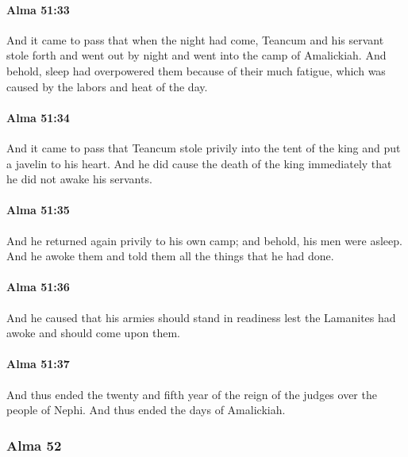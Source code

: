 		\paragraph{Alma 51:33} %
			\label{ALMA-51-33}

			And it came to pass that when the night had come,
			Teancum and his servant stole forth and went out by night
			and went into the camp of Amalickiah.
			And behold, sleep had overpowered them
			because of their much fatigue,
			which was caused by the labors and heat of the day.

		\paragraph{Alma 51:34} %
			\label{ALMA-51-34}

			And it came to pass that Teancum stole privily into the tent of the king
			and put a javelin to his heart.
			And he did cause the death of the king immediately
			that he did not awake his servants.

		\paragraph{Alma 51:35} %
			\label{ALMA-51-35}

			And he returned again privily to his own camp;
			and behold, his men were asleep.
			And he awoke them and told them all the things that he had done.

		\paragraph{Alma 51:36} %
			\label{ALMA-51-36}

			And he caused that his armies should stand in readiness
			lest the Lamanites had awoke and should come upon them.

		\paragraph{Alma 51:37} %
			\label{ALMA-51-37}

			And thus ended the twenty and fifth year
			of the reign of the judges over the people of Nephi.
			And thus ended the days of Amalickiah.

	\subsubsection{Alma 52} %
		\label{ALMA-52}
		
